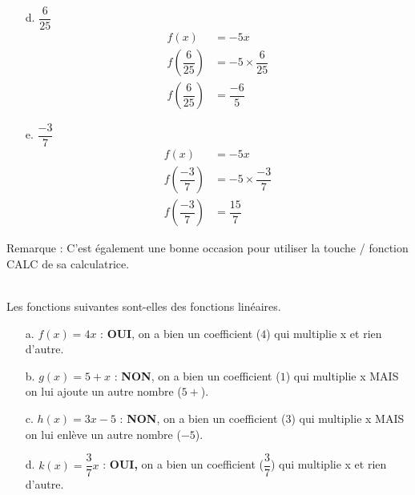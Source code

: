 \documentclass[11pt]{article}
\begin{document}
\begin{multicols}{2}
\begin{enumerate}
     \item[d.] $\dfrac{6}{25}$
    \begin{align*}
        f(x) &= -5x \\
        f(\dfrac{6}{25}) &= -5 \times \dfrac{6}{25} \\
        f(\dfrac{6}{25}) &= \dfrac{-6}{5}       
    \end{align*}\columnbreak

     \item[e.] $\dfrac{-3}{7}$
    \begin{align*}
        f(x) &= -5x \\
        f(\dfrac{-3}{7}) &= -5 \times \dfrac{-3}{7} \\
        f(\dfrac{-3}{7}) &= \dfrac{15}{7}      
    \end{align*}                  
\end{enumerate}
\end{multicols}
Remarque : C'est également une bonne occasion pour utiliser la touche / fonction CALC de sa calculatrice.


 \\
Les fonctions suivantes sont-elles des fonctions linéaires.
\begin{enumerate}
    \item[a.] $f(x) = 4x$ : \textbf{OUI}, on a bien un coefficient ($4$) qui multiplie x et rien d'autre. 
    \item[b.] $g(x) = 5 + x$ : \textbf{NON}, on a bien un coefficient ($1$) qui multiplie x MAIS on lui ajoute un autre nombre ($5+$).
    \item[c.] $h(x) = 3x - 5$ : \textbf{NON}, on a bien un coefficient ($3$) qui multiplie x MAIS on lui enlève un autre nombre ($-5$).
    \item[d.] $k(x) = \dfrac{3}{7}x$ : \textbf{OUI,} on a bien un coefficient ($\dfrac{3}{7}$) qui multiplie x et rien d'autre. 
\end{enumerate}
\end{document}
